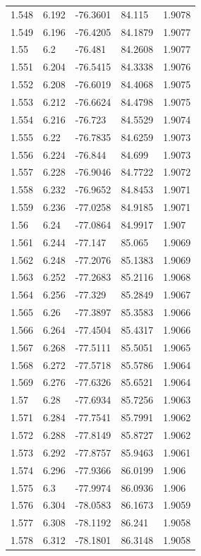 \begin{tabular}{lllll}
1.548 & 6.192 & -76.3601 & 84.115 & 1.9078 \\
1.549 & 6.196 & -76.4205 & 84.1879 & 1.9077 \\
1.55 & 6.2 & -76.481 & 84.2608 & 1.9077 \\
1.551 & 6.204 & -76.5415 & 84.3338 & 1.9076 \\
1.552 & 6.208 & -76.6019 & 84.4068 & 1.9075 \\
1.553 & 6.212 & -76.6624 & 84.4798 & 1.9075 \\
1.554 & 6.216 & -76.723 & 84.5529 & 1.9074 \\
1.555 & 6.22 & -76.7835 & 84.6259 & 1.9073 \\
1.556 & 6.224 & -76.844 & 84.699 & 1.9073 \\
1.557 & 6.228 & -76.9046 & 84.7722 & 1.9072 \\
1.558 & 6.232 & -76.9652 & 84.8453 & 1.9071 \\
1.559 & 6.236 & -77.0258 & 84.9185 & 1.9071 \\
1.56 & 6.24 & -77.0864 & 84.9917 & 1.907 \\
1.561 & 6.244 & -77.147 & 85.065 & 1.9069 \\
1.562 & 6.248 & -77.2076 & 85.1383 & 1.9069 \\
1.563 & 6.252 & -77.2683 & 85.2116 & 1.9068 \\
1.564 & 6.256 & -77.329 & 85.2849 & 1.9067 \\
1.565 & 6.26 & -77.3897 & 85.3583 & 1.9066 \\
1.566 & 6.264 & -77.4504 & 85.4317 & 1.9066 \\
1.567 & 6.268 & -77.5111 & 85.5051 & 1.9065 \\
1.568 & 6.272 & -77.5718 & 85.5786 & 1.9064 \\
1.569 & 6.276 & -77.6326 & 85.6521 & 1.9064 \\
1.57 & 6.28 & -77.6934 & 85.7256 & 1.9063 \\
1.571 & 6.284 & -77.7541 & 85.7991 & 1.9062 \\
1.572 & 6.288 & -77.8149 & 85.8727 & 1.9062 \\
1.573 & 6.292 & -77.8757 & 85.9463 & 1.9061 \\
1.574 & 6.296 & -77.9366 & 86.0199 & 1.906 \\
1.575 & 6.3 & -77.9974 & 86.0936 & 1.906 \\
1.576 & 6.304 & -78.0583 & 86.1673 & 1.9059 \\
1.577 & 6.308 & -78.1192 & 86.241 & 1.9058 \\
1.578 & 6.312 & -78.1801 & 86.3148 & 1.9058 \\

\end{tabular}
